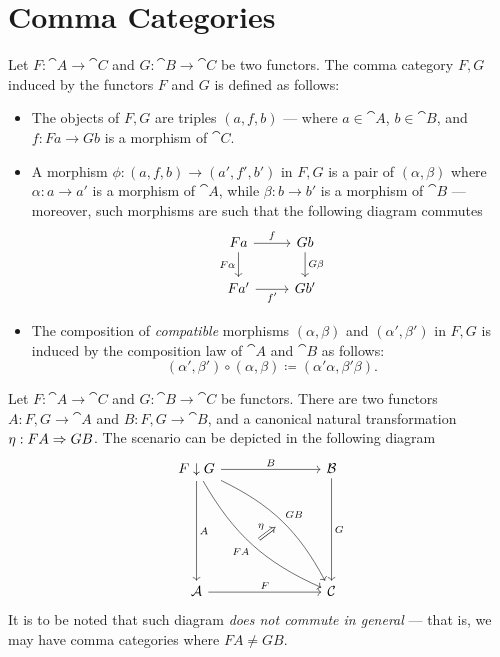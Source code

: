 \section{Comma Categories}

\begin{definition}
\label{def:comma-category}
Let \(F: \cat A \to \cat C\) and \(G: \cat B \to \cat C\) be two functors. The
comma category \(F \comma G\) induced by the functors \(F\) and \(G\) is defined
as follows:
\begin{itemize}\setlength\itemsep{0em}
\item The objects of \(F \comma G\) are triples \((a, f, b)\) --- where
  \(a \in \cat A\), \(b \in \cat B\), and \(f: F a \to G b\) is a morphism of
  \(\cat C\).

\item A morphism \(\phi: (a, f, b) \to (a', f', b')\) in \(F \comma G\) is a
  pair of \((\alpha, \beta)\) where \(\alpha: a \to a'\) is a morphism of
  \(\cat A\), while \(\beta: b \to b'\) is a morphism of \(\cat B\) ---
  moreover, such morphisms are such that the following diagram commutes
  \[
  \begin{tikzcd}
  F a \ar[r, "f"] \ar[d, "F \alpha"'] & G b \ar[d, "G \beta"] \\
  F a' \ar[r, "f'"'] & G b'
  \end{tikzcd}
  \]

\item The composition of \emph{compatible} morphisms \((\alpha, \beta)\) and
  \((\alpha', \beta')\) in \(F \comma G\) is induced by the composition law of
  \(\cat A\) and \(\cat B\) as follows:
  \[
  (\alpha', \beta') \circ (\alpha, \beta)
  \coloneq (\alpha' \alpha, \beta' \beta).
  \]
\end{itemize}
\end{definition}

\begin{proposition}
\label{prop:comma-cat-proj-functors}
Let \(F: \cat A \to \cat C\) and \(G: \cat B \to \cat C\) be functors. There are
two functors \(A: F \comma G \to \cat A\) and \(B: F \comma G \to \cat B\), and
a canonical natural transformation \(\eta: F A \Rightarrow G B\). The scenario can be
depicted in the following diagram
\[
\begin{tikzcd}
F \comma G
\ar[rrr, "B"]
\ar[rrrdddd, bend left=18, "G B", ""'{name=GB}]
\ar[rrrdddd, bend right=18, "F A"', ""{name=FA}]
\ar[dddd, "A"]
& & & \cat B \ar[dddd, "G"] \\ \\ \\ \\
\cat A \ar[rrr, "F"] & & &\cat C
\ar[Rightarrow, "\eta", from=FA, to=GB]
\end{tikzcd}
\]
It is to be noted that such diagram \emph{does not commute in general} --- that
is, we may have comma categories where \(FA \neq G B\).
\end{proposition}

